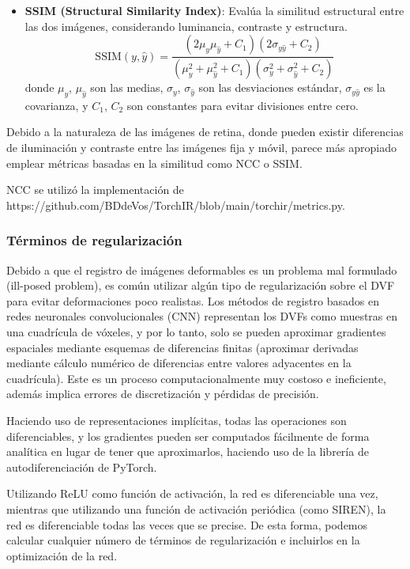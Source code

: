 \begin{itemize}
    \item \textbf{SSIM (Structural Similarity Index)}:
    Evalúa la similitud estructural entre las dos imágenes, considerando luminancia, contraste y estructura.
    \[
    \text{SSIM}(y, \hat{y}) = \frac{(2\mu_y\mu_{\hat{y}} + C_1)(2\sigma_{y\hat{y}} + C_2)}{(\mu_y^2 + \mu_{\hat{y}}^2 + C_1)(\sigma_y^2 + \sigma_{\hat{y}}^2 + C_2)}
    \]
    donde \( \mu_y \), \( \mu_{\hat{y}} \) son las medias, \( \sigma_y \), \( \sigma_{\hat{y}} \) son las desviaciones estándar, \( \sigma_{y\hat{y}} \) es la covarianza, y \( C_1 \), \( C_2 \) son constantes para evitar divisiones entre cero. \cite{Palubinskas02012017}
\end{itemize}

Debido a la naturaleza de las imágenes de retina, donde pueden existir diferencias de iluminación y contraste entre las imágenes fija y móvil,
parece más apropiado emplear métricas basadas en la similitud como NCC o SSIM.

NCC se utilizó la implementación de https://github.com/BDdeVos/TorchIR/blob/main/torchir/metrics.py.

\subsubsection{Términos de regularización}\label{subsubsec:Termos de regularización}

Debido a que el registro de imágenes deformables es un problema mal formulado (ill-posed problem),
es común utilizar algún tipo de regularización sobre el DVF para evitar deformaciones poco realistas.
Los métodos de registro basados en redes neuronales convolucionales (CNN) representan los DVFs
como muestras en una cuadrícula de vóxeles, y por lo tanto, solo se pueden aproximar gradientes espaciales
mediante esquemas de diferencias finitas (aproximar derivadas mediante cálculo numérico de diferencias entre valores adyacentes en la cuadrícula).
Este es un proceso computacionalmente muy costoso e ineficiente, además implica errores de discretización y pérdidas de precisión.

Haciendo uso de representaciones implícitas, todas las operaciones son diferenciables, y los gradientes pueden
ser computados fácilmente de forma analítica en lugar de tener que aproximarlos, haciendo uso de la librería de autodiferenciación de PyTorch.

Utilizando ReLU como función de activación, la red es diferenciable una vez, mientras que utilizando
una función de activación periódica (como SIREN), la red es diferenciable todas las veces que se precise.
De esta forma, podemos calcular cualquier número de términos de regularización e incluirlos en la optimización de la red.

